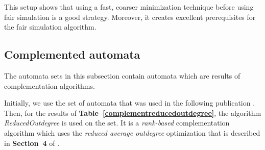 \documentclass[12pt,oneside,bibliography=totoc,abstracton]{scrartcl}
\newcommand{\tableref}[1]{\textbf{Table~\ref{#1}}}
\newcommand{\libref}[1]{\textbf{\cite{#1}}}
\begin{document}
This setup shows that using a fast, coarser minimization technique before using fair simulation is a good strategy.
Moreover, it creates excellent prerequisites for the fair simulation algorithm.

\subsection{Complemented automata}\label{section_complementedautomata}
The automata sets in this subsection contain automata which are results of complementation algorithms.

Initially, we use the set of automata that was used in the following publication \libref{complementautomata}.
Then, for the results of \tableref{complementreducedoutdegree}, the algorithm \textit{ReducedOutdegree}
is used on the set. It is a \textit{rank-based} complementation algorithm which uses the
\textit{reduced average outdegree} optimization that is described in \textbf{Section~4} of \libref{reducedoutdegree}.
\end{document}
